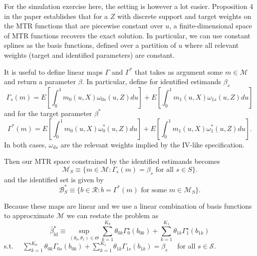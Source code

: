 \documentclass[11pt, a4paper, leqno]{article}
\begin{document}
For the simulation exercise here, the setting is however a lot easier. Proposition 4 in the paper establishes that for a $Z$ with discrete support and target weights on the MTR functions that are piecewise constant over $u$, a finite-dimensional space of MTR functions recovers the exact solution.
In particular, we can use constant splines as the basis functions, defined over a partition of $u$ where all relevant weights (target and identified parameters) are constant.

It is useful to define linear maps $\Gamma$ and $\Gamma^*$ that takes as argument some $m\in\mathcal{M}$ and return a parameter $\beta$.
In particular, define for identified estimands $\beta_s$
\begin{equation}
    \Gamma_s(m) = E\left[\int_0^1 m_0(u,X)\omega_{0s}(u,Z)du\right]
    + E\left[\int_0^1 m_1(u,X)\omega_{1s}(u,Z)du\right]
\end{equation}
and for the target parameter $\beta^*$
\begin{equation}
    \Gamma^*(m) = E\left[\int_0^1 m_0(u,X)\omega^*_{0}(u,Z)du\right]
    + E\left[\int_0^1 m_1(u,X)\omega^*_{1}(u,Z)du\right].
\end{equation}
In both cases, $\omega_{ds}$ are the relevant weights implied by the IV-like specification.

Then our MTR space constrained by the identified estimands becomes
\begin{equation}
    \mathcal{M}_S \equiv \{m\in \mathcal{M}: \Gamma_s(m) = \beta_s \text{ for all } s\in S\}.
\end{equation}
and the identified set is given by
\begin{equation}
    \mathcal{B}^*_S \equiv \{b \in \mathcal{R}: b = \Gamma^*(m) \text{ for some } m \in \mathcal{M}_S\}.
\end{equation}

Because these maps are linear and we use a linear combination of basis functions to approcximate $\mathcal{M}$ we can restate the problem as
$$
\bar{\beta}_{\mathrm{fd}}^{\star} \equiv \sup _{\left(\theta_0, \theta_1\right) \in \Theta} \sum_{k=1}^{K_0} \theta_{0 k} \Gamma_0^{\star}\left(b_{0 k}\right)+\sum_{k=1}^{K_1} \theta_{1 k} \Gamma_1^{\star}\left(b_{1 k}\right)
$$
s.t. $\quad \sum_{k=1}^{K_0} \theta_{0 k} \Gamma_{0 s}\left(b_{0 k}\right)+\sum_{k=1}^{K_1} \theta_{1 k} \Gamma_{1 s}\left(b_{1 k}\right)=\beta_s \quad$ for all $s \in \mathcal{S}$.
\end{document}
